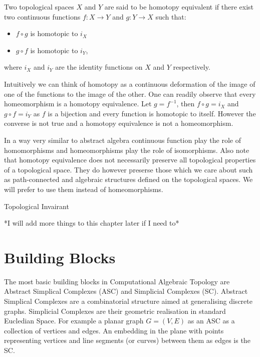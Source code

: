 \begin{defn} Two topological spaces $X$ and $Y$ are said to be homotopy equivalent if there exist two continuous functions $f: X \to Y$ and $g: Y \to X$ such that:  \end{defn}
\begin{itemize}
    \item $f \circ g$ is homotopic to $i_X$ 
    \item $g \circ f$ is homotopic to $i_Y$,
\end{itemize}

where $i_X$ and $i_Y$ are the identity functions on $X$ and $Y$ respectively.

Intuitively we can think of homotopy as a continuous deformation of the image of one of the functions to the image of the other. One can readily observe that every homeomorphism is a homotopy equivalence. Let $g = f^{-1}$, then $f \circ g = i_X$ and $g \circ f = i_Y$ as $f$ is a bijection and every function is homotopic to itself. However the converse is not true and a homotopy equivalence is not a homeomorphism.

In a way very similar to abstract algebra continuous function play the role of homomorphisms and homeomorphisms play the role of isomorphisms. Also note that homotopy equivalence does not necessarily preserve all topological properties of a topological space. They do however preserse those which we care about such as path-connected and algebraic structures defined on the topological spaces. We will prefer to use them instead of homeomorphisms. 


\begin{defn}{Topological Invairant}   \end{defn}

*I will add more things to this chapter later if I need to*


\section{Building Blocks}

The most basic building blocks in Computational Algebraic Topology are Abstract Simplical Complexes (ASC) and Simplicial Complexes (SC). Abstract Simplical Complexes are a combinatorial structure aimed at generalising discrete graphs. Simplicial Complexes are their geometric realisation in standard Eucledian Space. For example a planar graph $G = (V, E)$ as an ASC as a collection of vertices and edges. An embedding in the plane with points representing vertices and line segments (or curves) between them as edges is the SC.

